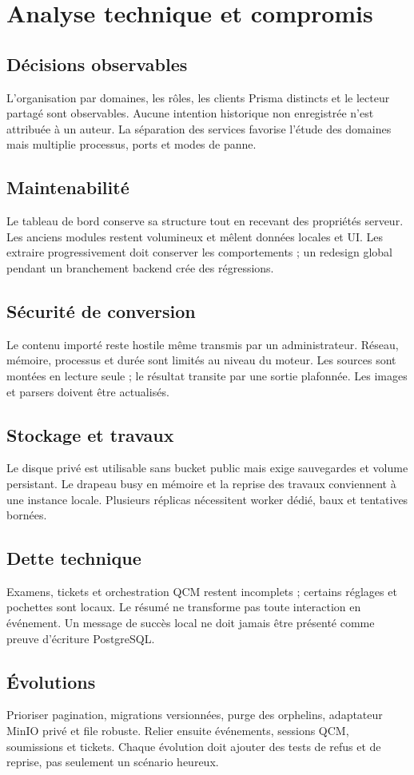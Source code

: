 \chapter{Analyse technique et compromis}
\section{Décisions observables}
L’organisation par domaines, les rôles, les clients Prisma distincts et le lecteur partagé sont observables. Aucune intention historique non enregistrée n’est attribuée à un auteur. La séparation des services favorise l’étude des domaines mais multiplie processus, ports et modes de panne.

\section{Maintenabilité}
Le tableau de bord conserve sa structure tout en recevant des propriétés serveur. Les anciens modules restent volumineux et mêlent données locales et UI. Les extraire progressivement doit conserver les comportements ; un redesign global pendant un branchement backend crée des régressions.

\section{Sécurité de conversion}
Le contenu importé reste hostile même transmis par un administrateur. Réseau, mémoire, processus et durée sont limités au niveau du moteur. Les sources sont montées en lecture seule ; le résultat transite par une sortie plafonnée. Les images et parsers doivent être actualisés.

\section{Stockage et travaux}
Le disque privé est utilisable sans bucket public mais exige sauvegardes et volume persistant. Le drapeau busy en mémoire et la reprise des travaux conviennent à une instance locale. Plusieurs réplicas nécessitent worker dédié, baux et tentatives bornées.

\section{Dette technique}
Examens, tickets et orchestration QCM restent incomplets ; certains réglages et pochettes sont locaux. Le résumé ne transforme pas toute interaction en événement. Un message de succès local ne doit jamais être présenté comme preuve d’écriture PostgreSQL.

\section{Évolutions}
Prioriser pagination, migrations versionnées, purge des orphelins, adaptateur MinIO privé et file robuste. Relier ensuite événements, sessions QCM, soumissions et tickets. Chaque évolution doit ajouter des tests de refus et de reprise, pas seulement un scénario heureux.
